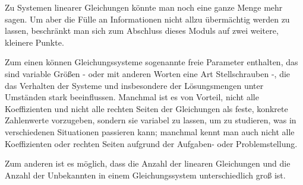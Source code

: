 \begin{MIntro}
Zu Systemen linearer Gleichungen könnte man noch eine ganze Menge mehr sagen. Um aber die Fülle an
Informationen nicht allzu übermächtig werden zu lassen, beschränkt man sich zum Abschluss dieses Moduls
auf zwei weitere, kleinere Punkte.

Zum einen können Gleichungssysteme sogenannte freie Parameter enthalten, das sind variable
Größen - oder mit anderen Worten eine Art Stellschrauben -, die das Verhalten der Systeme und insbesondere
der Lösungsmengen unter Umständen stark beeinflussen. Manchmal ist es von Vorteil, nicht alle Koeffizienten und nicht
alle rechten Seiten der Gleichungen als feste, konkrete Zahlenwerte vorzugeben, sondern sie variabel
zu lassen, um zu studieren, was in verschiedenen Situationen passieren kann; manchmal kennt man auch nicht
alle Koeffizienten oder rechten Seiten aufgrund der Aufgaben- oder Problemstellung.

Zum anderen ist es möglich, dass die Anzahl der linearen Gleichungen und
 die Anzahl der Unbekannten in einem Gleichungssystem unterschiedlich groß ist.%
\end{MIntro}

